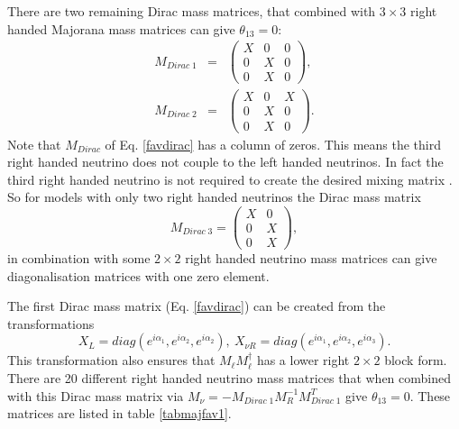 \documentclass[nofootinbib,showpacs]{revtex4}
\begin{document}
There are two remaining Dirac mass matrices, that combined with $3\times 3$ right handed Majorana mass matrices can give $\theta_{13}=0$:
\begin{eqnarray}\label{favdirac}
M_{Dirac\;1}&=&\left(\begin{array}{ccc}X&0&0\\0&X&0\\0&X&0\end{array}\right),\\
M_{Dirac\;2}&=&\left(\begin{array}{ccc}X&0&X\\0&X&0\\0&X&0\end{array}\right).\label{favdirac2}
\end{eqnarray} 
Note that $M_{Dirac}$ of Eq. \ref{favdirac} has a column of zeros. This means the third right handed neutrino does not couple to the left handed neutrinos. In fact the third right handed neutrino is not required to create the desired mixing matrix \cite{matheta13,LavLmodel2}. So for models with only two right handed neutrinos the Dirac mass matrix
\begin{equation}\label{favdirac3}
M_{Dirac\;3}=\left(\begin{array}{cc}X&0\\0&X\\0&X\end{array}\right),
\end{equation}
in combination with some $2\times 2$ right handed neutrino mass matrices can give diagonalisation matrices with one zero element.


The first Dirac mass matrix (Eq. \ref{favdirac}) can be created from the transformations
\begin{equation}
X_L=diag(e^{i \alpha_1},e^{i \alpha_2},e^{i \alpha_2}),\: X_{\nu R}=diag(e^{i \alpha_1},e^{i \alpha_2},e^{i \alpha_3}).
\end{equation}
This transformation also ensures that $M_{\ell} M_{\ell}^\dagger$ has a lower right $2\times 2$ block form.
There are 20 different right handed neutrino mass matrices that when combined with this Dirac mass matrix via $M_\nu=-M_{Dirac\;1}M_R^{-1}M_{Dirac\;1}^T$ give $\theta_{13}=0$. These matrices are listed in table \ref{tabmajfav1}.
\end{document}
